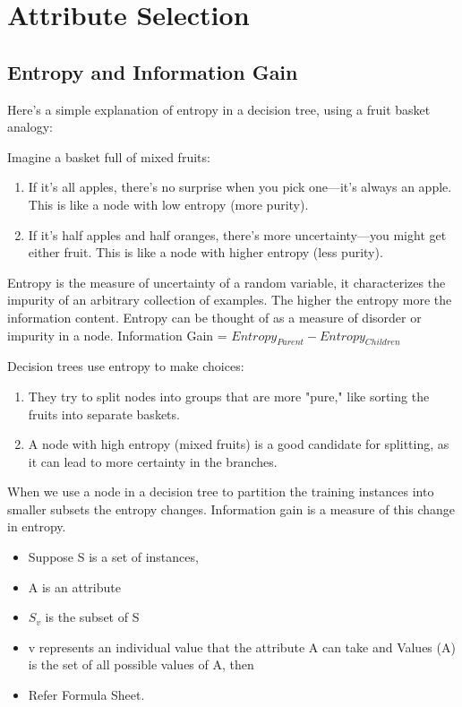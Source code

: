 \section{Attribute Selection}

    \subsection{Entropy and Information Gain}
        Here's a simple explanation of entropy in a decision tree, using a fruit basket analogy:

        Imagine a basket full of mixed fruits:
        \begin{enumerate}
            \item If it's all apples, there's no surprise when you pick one—it's always an apple. This is like a node with low entropy (more purity).
            \item If it's half apples and half oranges, there's more uncertainty—you might get either fruit. This is like a node with higher entropy (less purity).
        \end{enumerate}
        Entropy is the measure of uncertainty of a random variable, it characterizes the impurity of an arbitrary collection of examples. The higher the entropy more the information content. Entropy can be thought of as a measure of disorder or impurity in a node. 
        Information Gain  = $Entropy_{Parent} - Entropy_{Children}$
        
        Decision trees use entropy to make choices:
        \begin{enumerate}
            \item They try to split nodes into groups that are more "pure," like sorting the fruits into separate baskets.
            \item A node with high entropy (mixed fruits) is a good candidate for splitting, as it can lead to more certainty in the branches.
        \end{enumerate}
        
        When we use a node in a decision tree to partition the training instances into smaller subsets the entropy changes. Information gain is a measure of this change in entropy.
        \begin{itemize}
            \item Suppose S is a set of instances,
            \item A is an attribute
            \item $S_v$ is the subset of S
            \item v represents an individual value that the attribute A can take and Values (A) is the set of all possible values of A, then
            \item Refer Formula Sheet.
        \end{itemize}
        
